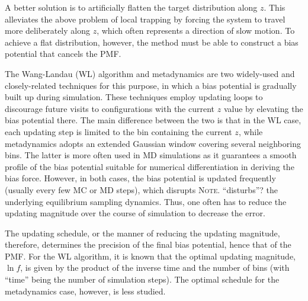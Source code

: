 \documentclass[reprint, floatfix]{revtex4-1}
\newcommand{\note}[1]{{\color{DarkGreen}\footnotesize \textsc{Note.} #1}}
\begin{document}
A better solution is to artificially flatten
the target distribution along $z$\cite{mezei1987, berg1992, lee1993,
wang2001, wang2001pre, laio2002, laio2008, barducci2011, sutto2012}.
%
This alleviates the above problem of local trapping
by forcing the system to travel more
deliberately along $z$,
which often represents
a direction of slow motion.
%
To achieve a flat distribution, however,
the method must be able to construct a
bias potential that cancels the PMF.



The Wang-Landau (WL) algorithm\cite{wang2001, wang2001pre}
and meta\-dy\-nam\-ics\cite{huber1994, laio2002,
laio2008, barducci2011, sutto2012}
are two widely-used and closely-related\cite{micheletti2004}
techniques for this purpose,
in which a bias potential is gradually built up
during simulation.
%
These techniques employ updating loops
to discourage future visits to configurations
with the current $z$ value
by elevating the bias potential there.
%
The main difference between the two
is that in the WL case,
each updating step is limited to the bin
containing the current $z$,
while metadynamics adopts an extended
Gaussian window
covering several neighboring bins.
%
The latter is more often used in MD simulations
as it guarantees a smooth profile
of the bias potential
suitable for numerical differentiation
in deriving the bias force.
%
However, in both cases, the bias potential
is updated frequently (usually every few MC or MD steps),
which %
disrupts \note{``disturbs''?} the underlying
equilibrium sampling dynamics\cite{laio2002}.
%
Thus, one often has to reduce
the updating magnitude
over the course of simulation
to decrease the error.



The updating schedule,
or the manner of reducing
the updating magnitude,
therefore,
determines the precision of the final bias potential,
hence that of the PMF\cite{liang2007,
belardinelli2007, belardinelli2007jcp, belardinelli2008,
morozov2007, zhou2008, morozov2009,
komura2012, caparica2012, caparica2014,
barducci2008, dickson2011, dama2014}.
%
For the WL algorithm, it is known
that the optimal updating magnitude, $\ln f$,
is given by the product of the
inverse time\cite{liang2007,
belardinelli2007, belardinelli2007jcp, belardinelli2008,
morozov2007, zhou2008}
and the number of bins
(with ``time'' being
the number of simulation steps).
%
The optimal schedule for the metadynamics case,
however, is less studied.
\end{document}
